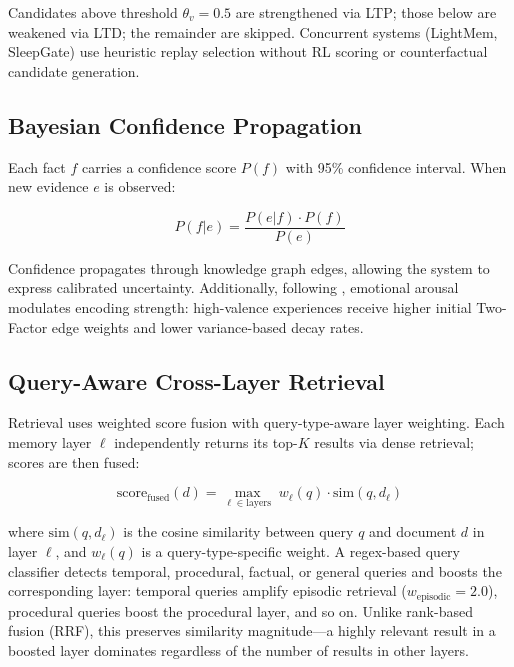 \documentclass{article}
\begin{document}
Candidates above threshold $\theta_v = 0.5$ are strengthened via LTP;
those below are weakened via LTD; the remainder are skipped.
Concurrent systems (LightMem, SleepGate) use heuristic replay selection
without RL scoring or counterfactual candidate generation.

\subsection{Bayesian Confidence Propagation}
\label{sec:bayes-formula}

Each fact $f$ carries a confidence score $P(f)$ with 95\% confidence interval.
When new evidence $e$ is observed:

\begin{equation}
    P(f | e) = \frac{P(e | f) \cdot P(f)}{P(e)}
\end{equation}

Confidence propagates through knowledge graph edges,
allowing the system to express calibrated uncertainty.
Additionally, following \citet{mcgaugh2004}, emotional arousal modulates
encoding strength: high-valence experiences receive higher initial
Two-Factor edge weights and lower variance-based decay rates.

\subsection{Query-Aware Cross-Layer Retrieval}
\label{sec:query-formula}

Retrieval uses weighted score fusion with query-type-aware layer weighting.
Each memory layer $\ell$ independently returns its top-$K$ results via dense
retrieval; scores are then fused:

\begin{equation}
    \text{score}_{\text{fused}}(d) = \max_{\ell \in \text{layers}} \; w_\ell(q) \cdot \text{sim}(q, d_\ell)
\end{equation}

where $\text{sim}(q, d_\ell)$ is the cosine similarity between query $q$ and
document $d$ in layer $\ell$, and $w_\ell(q)$ is a query-type-specific weight.
A regex-based query classifier detects temporal, procedural, factual, or
general queries and boosts the corresponding layer: temporal queries amplify
episodic retrieval ($w_{\text{episodic}} = 2.0$), procedural queries boost the
procedural layer, and so on. Unlike rank-based fusion (RRF), this preserves
similarity magnitude---a highly relevant result in a boosted layer dominates
regardless of the number of results in other layers.
\end{document}
